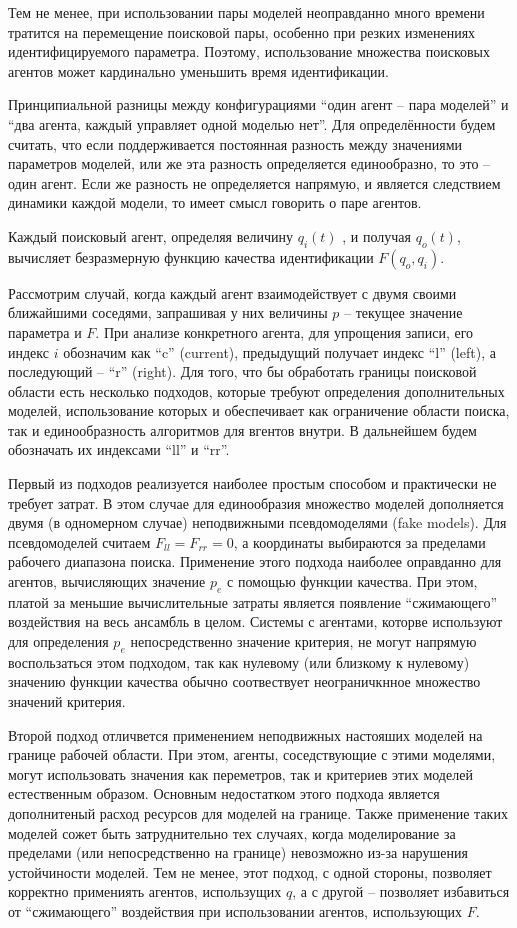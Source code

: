 Тем не менее, при использовании пары моделей неоправданно много времени
тратится на перемещение поисковой пары, особенно при резких изменениях
идентифицируемого параметра. Поэтому, использование множества
поисковых агентов может кардинально уменьшить время идентификации.

Принципиальной разницы между конфигурациями
``один агент -- пара моделей''
и
``два агента, каждый управляет одной моделью нет''.
Для определённости будем считать, что если поддерживается
постоянная разность между значениями параметров моделей,
или же эта разность определяется единообразно,
то это -- один агент. Если же разность
не определяется напрямую, и является следствием динамики каждой модели,
то имеет смысл говорить о паре агентов.

Каждый поисковый агент, определяя величину $q_{i}(t)$ , и получая $q_o(t)$,
вычисляет безразмерную функцию качества идентификации
$F(q_o,q_i)$.

Рассмотрим случай, когда каждый агент взаимодействует с двумя своими ближайшими соседями,
запрашивая у них величины $p$ -- текущее значение параметра и $F$.
При анализе конкретного агента, для упрощения записи, его индекс $i$ обозначим как ``c'' (current),
предыдущий получает индекс ``l'' (left), а последующий -- ``r'' (right).
Для того, что бы обработать границы поисковой области есть несколько подходов,
которые требуют определения дополнительных моделей, использование которых
и обеспечивает как ограничение области поиска, так и единообразность
алгоритмов для вгентов внутри.
В дальнейшем будем обозначать их индексами ``ll'' и ``rr''.

Первый из подходов реализуется наиболее простым способом
и практически не требует затрат.
В этом случае для единообразия множество моделей дополняется двумя
(в одномерном случае) неподвижными псевдомоделями (fake models).
Для псевдомоделей считаем $  F_{ll} = F_{rr} = 0$,
а координаты выбираются за пределами рабочего диапазона поиска.
Применение этого подхода наиболее оправданно для агентов,
вычисляющих значение $p_e$ с помощью функции качества.
При этом, платой за меньшие вычислительные затраты
является появление ``сжимающего'' воздействия на весь ансамбль в целом.
Системы с агентами, которве используют для определения $p_e$ непосредственно значение критерия,
не могут напрямую воспользаться этом подходом,
так как нулевому (или близкому к нулевому) значению функции качества
обычно соотвествует неограничкнное множество значений критерия.

Второй подход отличвется применением неподвижных настояших моделей
на границе рабочей области. При этом, агенты, соседствующие с этими моделями,
могут использовать  значения как переметров, так и критериев этих
моделей естественным образом. Основным недостатком этого подхода
является дополнитеный расход ресурсов для моделей на границе.
Также применение таких моделей сожет быть затруднительно тех случаях,
когда моделирование за пределами (или непосредственно на границе)
невозможно из-за нарушения устойчиности моделей.
Тем не менее, этот подход, с одной стороны,
позволяет корректно примениять агентов, использущих $q$,
а с другой -- позволяет избавиться от ``сжимающего'' воздействия
при использовании агентов, использующих $F$.

